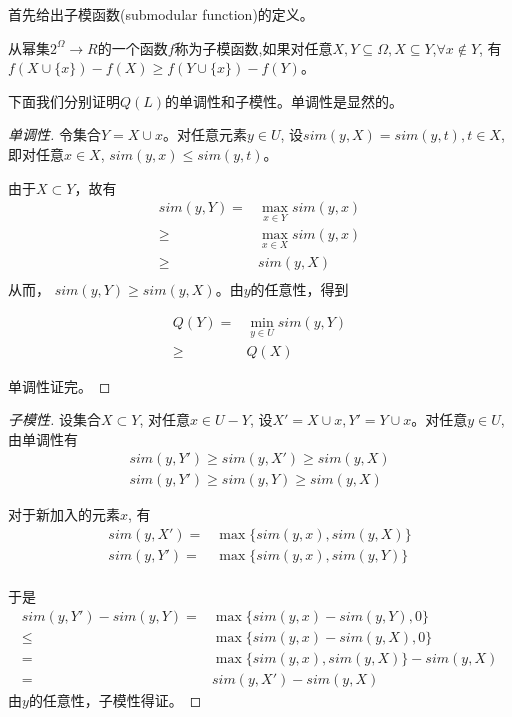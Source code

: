 首先给出子模函数(submodular function)的定义。
\begin{definition}[子模函数]
从幂集$2^\Omega \to R$的一个函数$f$称为子模函数,如果对任意$X,Y \subseteq \Omega, X \subseteq Y$,$\forall x \notin Y$, 有$f(X \cup \{x\} ) - f(X) \geq f(Y \cup \{x\} ) - f(Y)$。
\end{definition}

下面我们分别证明$Q(L)$的单调性和子模性。单调性是显然的。
\begin{proof}[单调性]
令集合$Y=X\cup{x}$。对任意元素$y \in U$, 设$sim(y, X) = sim(y, t), t \in X$, 即对任意$x \in X$, $sim(y,x) \le sim(y,t)$。

由于$X \subset Y$，故有
\begin{align*}
	sim(y,Y) = & \mathop {\max }\limits_{x \in Y} sim(y,x) \\
			\ge &  \mathop {\max }\limits_{x \in X} sim(y,x) \\
			\ge &  sim(y,X) \\
\end{align*}
从而， $sim(y, Y) \ge sim(y, X)$。由$y$的任意性，得到

\begin{align*}
	Q(Y) = & \mathop {\min }\limits_{y \in U} sim(y,Y) \\ 
		\ge & Q(X)
\end{align*}

单调性证完。
\end{proof}

\begin{proof}[子模性]
设集合$X \subset Y$, 对任意$x \in U - Y$, 设$X' = X\cup{x}, Y' = Y\cup{x}$。对任意$y \in U$, 由单调性有
\begin{eqnarray*}
	sim(y, Y') \ge sim(y, X') \ge sim(y, X) \\
	sim(y, Y') \ge sim(y, Y) \ge sim(y, X) 
\end{eqnarray*}

对于新加入的元素$x$, 有
\begin{align*}
	sim(y, X') = & \max\{ sim(y, x), sim(y,X) \} \\
	sim(y, Y') = & \max\{ sim(y, x), sim(y,Y) \} \\
\end{align*}

于是
\begin{align*}
	sim(y, Y') - sim(y, Y) = & \max \{ sim(y, x) - sim(y, Y), 0\} \\
						\le & \max \{ sim(y, x) - sim(y, X), 0 \} \\
						= & \max \{ sim(y, x), sim(y, X) \} - sim(y, X) \\
						= & sim(y, X') - sim(y, X)						
\end{align*}
由$y$的任意性，子模性得证。
\end{proof}

